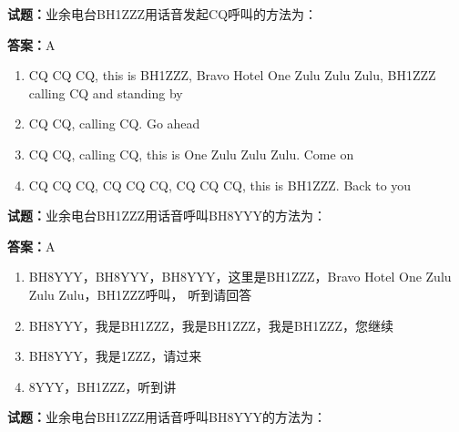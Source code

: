 \documentclass{ctexbook}
\begin{document}




\vspace{1em}

\textbf{试题：}业余电台BH1ZZZ用话音发起CQ呼叫的方法为： 

\textbf{答案：}A 

\begin{enumerate}[leftmargin=3em]
  \item CQ CQ CQ, this is BH1ZZZ, Bravo Hotel One Zulu Zulu Zulu, BH1ZZZ calling CQ and standing by 

  \item CQ CQ, calling CQ. Go ahead 

  \item CQ CQ, calling CQ, this is One Zulu Zulu Zulu. Come on 

  \item CQ CQ CQ, CQ CQ CQ, CQ CQ CQ, this is BH1ZZZ. Back to you 

\end{enumerate}





\vspace{1em}

\textbf{试题：}业余电台BH1ZZZ用话音呼叫BH8YYY的方法为： 

\textbf{答案：}A 

\begin{enumerate}[leftmargin=3em]
  \item BH8YYY，BH8YYY，BH8YYY，这里是BH1ZZZ，Bravo Hotel One Zulu Zulu Zulu，BH1ZZZ呼叫，
听到请回答 

  \item BH8YYY，我是BH1ZZZ，我是BH1ZZZ，我是BH1ZZZ，您继续 

  \item BH8YYY，我是1ZZZ，请过来 

  \item 8YYY，BH1ZZZ，听到讲 

\end{enumerate}





\vspace{1em}

\textbf{试题：}业余电台BH1ZZZ用话音呼叫BH8YYY的方法为： 
\end{document}
